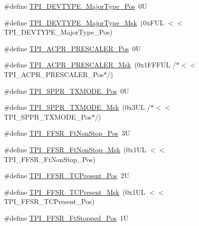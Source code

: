 \begin{DoxyCompactItemize}
\item 
\#define \mbox{\hyperlink{group___c_m_s_i_s___t_p_i_ga69c4892d332755a9f64c1680497cebdd}{T\+P\+I\+\_\+\+D\+E\+V\+T\+Y\+P\+E\+\_\+\+Major\+Type\+\_\+\+Pos}}~0U
\item 
\#define \mbox{\hyperlink{group___c_m_s_i_s___t_p_i_gaecbceed6d08ec586403b37ad47b38c88}{T\+P\+I\+\_\+\+D\+E\+V\+T\+Y\+P\+E\+\_\+\+Major\+Type\+\_\+\+Msk}}~(0x\+F\+U\+L $<$$<$ T\+P\+I\+\_\+\+D\+E\+V\+T\+Y\+P\+E\+\_\+\+Major\+Type\+\_\+\+Pos)
\item 
\#define \mbox{\hyperlink{group___c_m_s_i_s___t_p_i_ga5a82d274eb2df8b0c92dd4ed63535928}{T\+P\+I\+\_\+\+A\+C\+P\+R\+\_\+\+P\+R\+E\+S\+C\+A\+L\+E\+R\+\_\+\+Pos}}~0U
\item 
\#define \mbox{\hyperlink{group___c_m_s_i_s___t_p_i_ga4fcacd27208419929921aec8457a8c13}{T\+P\+I\+\_\+\+A\+C\+P\+R\+\_\+\+P\+R\+E\+S\+C\+A\+L\+E\+R\+\_\+\+Msk}}~(0x1\+F\+F\+F\+U\+L /$\ast$$<$$<$ T\+P\+I\+\_\+\+A\+C\+P\+R\+\_\+\+P\+R\+E\+S\+C\+A\+L\+E\+R\+\_\+\+Pos$\ast$/)
\item 
\#define \mbox{\hyperlink{group___c_m_s_i_s___t_p_i_ga0f302797b94bb2da24052082ab630858}{T\+P\+I\+\_\+\+S\+P\+P\+R\+\_\+\+T\+X\+M\+O\+D\+E\+\_\+\+Pos}}~0U
\item 
\#define \mbox{\hyperlink{group___c_m_s_i_s___t_p_i_gaca085c8a954393d70dbd7240bb02cc1f}{T\+P\+I\+\_\+\+S\+P\+P\+R\+\_\+\+T\+X\+M\+O\+D\+E\+\_\+\+Msk}}~(0x3\+U\+L /$\ast$$<$$<$ T\+P\+I\+\_\+\+S\+P\+P\+R\+\_\+\+T\+X\+M\+O\+D\+E\+\_\+\+Pos$\ast$/)
\item 
\#define \mbox{\hyperlink{group___c_m_s_i_s___t_p_i_ga9537b8a660cc8803f57cbbee320b2fc8}{T\+P\+I\+\_\+\+F\+F\+S\+R\+\_\+\+Ft\+Non\+Stop\+\_\+\+Pos}}~3U
\item 
\#define \mbox{\hyperlink{group___c_m_s_i_s___t_p_i_gaaa313f980974a8cfc7dac68c4d805ab1}{T\+P\+I\+\_\+\+F\+F\+S\+R\+\_\+\+Ft\+Non\+Stop\+\_\+\+Msk}}~(0x1\+U\+L $<$$<$ T\+P\+I\+\_\+\+F\+F\+S\+R\+\_\+\+Ft\+Non\+Stop\+\_\+\+Pos)
\item 
\#define \mbox{\hyperlink{group___c_m_s_i_s___t_p_i_gad30fde0c058da2ffb2b0a213be7a1b5c}{T\+P\+I\+\_\+\+F\+F\+S\+R\+\_\+\+T\+C\+Present\+\_\+\+Pos}}~2U
\item 
\#define \mbox{\hyperlink{group___c_m_s_i_s___t_p_i_ga0d6bfd263ff2fdec72d6ec9415fb1135}{T\+P\+I\+\_\+\+F\+F\+S\+R\+\_\+\+T\+C\+Present\+\_\+\+Msk}}~(0x1\+U\+L $<$$<$ T\+P\+I\+\_\+\+F\+F\+S\+R\+\_\+\+T\+C\+Present\+\_\+\+Pos)
\item 
\#define \mbox{\hyperlink{group___c_m_s_i_s___t_p_i_gaedf31fd453a878021b542b644e2869d2}{T\+P\+I\+\_\+\+F\+F\+S\+R\+\_\+\+Ft\+Stopped\+\_\+\+Pos}}~1U
$$
\end{DoxyCompactItemize}
